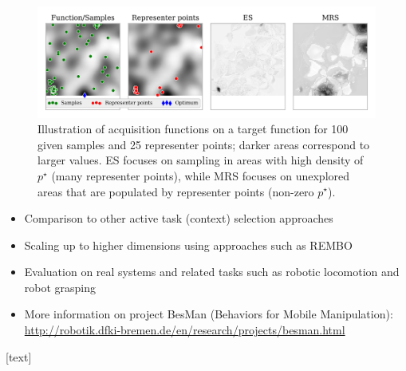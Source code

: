 \begin{block}{}
\begin{center}
\begin{figure}
\centering
\includegraphics[width=.9\textwidth]{../pics/es_analysis}
\caption{Illustration of acquisition functions on a target function for
100 given samples and 25 representer points; darker areas correspond to larger values. ES focuses on sampling in areas with high density of $p^\star$ (many representer points), while MRS focuses on unexplored areas that are populated by representer points (non-zero $p^\star$).
}
\label{fig:es_analysis}
\end{figure}

\end{center}
\end{block}

\begin{block}{}
\begin{itemize}
 \item Comparison to other active task (context) selection approaches \cite{fabisch_accounting_2015}
 \item Scaling up to higher dimensions using approaches such as REMBO
\cite{wang_bayesian_2013}
 \item Evaluation on real systems and related tasks such as robotic locomotion \cite{calandra_bayesian_2014,lizotte_automatic_2007} and robot grasping \cite{kroemer_combining_2010}
 \item More information on project BesMan (Behaviors for Mobile Manipulation):
\url{http://robotik.dfki-bremen.de/en/research/projects/besman.html}
\end{itemize}
\end{block}

\begin{block}{}

\begin{multicols}{2}
{\scriptsize
{}[text]


}
\end{multicols}

\end{block}

